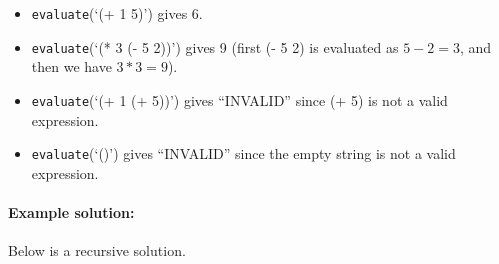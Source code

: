 \documentclass[11pt]{article}
\begin{document}
\begin{itemize}
\item \texttt{evaluate}(`(+ 1 5)') gives 6.
\item \texttt{evaluate}(`(* 3 (- 5 2))') gives 9 (first (- 5 2) is
  evaluated as $5-2 = 3$, and then we have $3*3 = 9$).
\item \texttt{evaluate}(`(+ 1 (+ 5))') gives ``INVALID'' since (+ 5)
  is not a valid expression.
\item \texttt{evaluate}(`()') gives ``INVALID'' since the empty string
  is not a valid expression.
\end{itemize}

\paragraph{Example solution:}
Below is a recursive solution.
\end{document}
